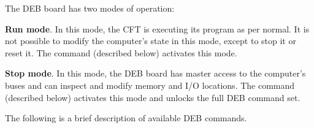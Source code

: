 The \gls{DEB} board has two modes of operation:

\begin{description}

\item{\bfseries Run mode}. In this mode, the CFT is executing its program as
  per normal. It is not possible to modify the computer's state in
  this mode, except to stop it or reset it. The  command
  (described below) activates this mode.

\item{\bfseries Stop mode}. In this mode, the \gls{DEB} board has master
  access to the computer's buses and can inspect and modify memory and
  I/O locations. The  command (described below) activates
  this mode and unlocks the full \gls{DEB} command set.

\end{description}

The following is a brief description of available \gls{DEB} commands.

